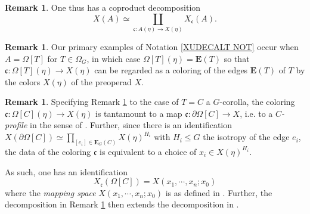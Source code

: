 \documentclass[a4paper,10pt
,draft
]{article}%
\numberwithin{equation}{section}
\numberwithin{figure}{section}
\theoremstyle{definition} %
\newtheorem{remark}[equation]{Remark}%
\newcommand{\1}{\ensuremath{\mathbbm 1}}%
\begin{document}
\begin{remark}\label{COLDEC REM}
	One thus has a coproduct decomposition
\[
	X(A) \simeq 
	\coprod_{\mathfrak{c} \colon A(\eta) \to X(\eta)}
	X_{\mathfrak{c}}(A).
\]    
\end{remark}


\begin{remark}\label{PRIEX REM}
	Our primary examples of Notation \eqref{XUDECALT NOT}
	occur when $A=\Omega[T]$ for $T \in \Omega_G$,
	in which case 
	$\Omega[T](\eta) = \boldsymbol{E}(T)$
	so that
	$\mathfrak{c} \colon 
	\Omega[T](\eta) \to X(\eta)$
	can be regarded as a coloring of the edges 
	$\boldsymbol{E}(T)$
	of $T$ by the colors $X(\eta)$ of the preoperad $X$.
\end{remark}


\begin{remark}\label{MAPSPTRANS REM}
	Specifying Remark \ref{PRIEX REM} to the case 
	of $T=C$ a $G$-corolla, the coloring
	$\mathfrak{c} \colon 
	\Omega[C](\eta) \to X(\eta)$
	is tantamount to a map
	$\mathfrak{c} \colon \partial \Omega[C] \to X$,
	i.e. to a \emph{$C$-profile} in the sense of 
	\cite[Def. 5.6]{BP_edss}.
	Further, since there is an identification
	$X(\partial \Omega[C])
	\simeq
	\prod_{[e_i] \in \boldsymbol{E}_G(C)} X(\eta)^{H_i}$
	with $H_i \leq G$ the isotropy of the edge $e_i$,
	the data of the coloring $\mathfrak{c}$
	is equivalent to a choice of $x_i \in X(\eta)^{H_i}$.
	
	As such, one has an identification
\begin{equation}\label{MAPSPTRANS EQ}
	X_{\mathfrak{c}}(\Omega[C]) = X(x_1,\cdots,x_n;x_0)
\end{equation}
	where the \emph{mapping space}
	$X(x_1,\cdots,x_n;x_0)$
	is as defined in \cite[Defn. 5.7]{BP_edss}.
	Further, 
	the decomposition in Remark \ref{COLDEC REM}
	then extends the decomposition in 
	\cite[Rmk. 5.14]{BP_edss}.
\end{remark}
\end{document}
